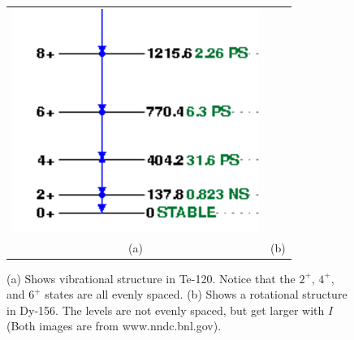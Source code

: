\documentclass[letter]{article}
\begin{document}
\begin{itemize}
\begin{figure}[hbt]
\begin{tabular}{cc}
    \includegraphics{images/dy_156_vib} \\
      \small{(a)} & \small{(b)}
    \end{tabular}
    \caption{(a) Shows vibrational structure in Te-120. Notice that the $2^+$,
      $4^+$, and $6^+$ states are all evenly spaced. (b) Shows a
      rotational structure in Dy-156. The levels are not evenly
      spaced, but get larger with $I$ (Both images are from www.nndc.bnl.gov).}
    \label{fig:te120}
  \end{figure}

\end{itemize}
\end{document}
